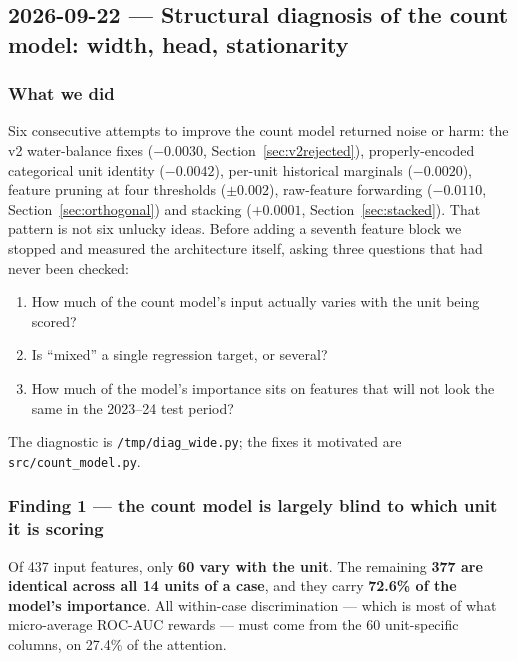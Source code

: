 \subsection{2026-09-22 --- Structural diagnosis of the count model: width, head, stationarity}
\label{sec:diagnosis}

\subsubsection*{What we did}

Six consecutive attempts to improve the count model returned noise or harm: the v2 water-balance
fixes ($-0.0030$, Section~\ref{sec:v2rejected}), properly-encoded categorical unit identity
($-0.0042$), per-unit historical marginals ($-0.0020$), feature pruning at four thresholds
($\pm 0.002$), raw-feature forwarding ($-0.0110$, Section~\ref{sec:orthogonal}) and stacking
($+0.0001$, Section~\ref{sec:stacked}). That pattern is not six unlucky ideas. Before adding a
seventh feature block we stopped and measured the architecture itself, asking three questions
that had never been checked:

\begin{enumerate}
  \item How much of the count model's input actually varies with the unit being scored?
  \item Is ``mixed'' a single regression target, or several?
  \item How much of the model's importance sits on features that will not look the same in the
        2023--24 test period?
\end{enumerate}

The diagnostic is \texttt{/tmp/diag\_wide.py}; the fixes it motivated are
\texttt{src/count\_model.py}.

\subsubsection*{Finding 1 --- the count model is largely blind to which unit it is scoring}

\begin{finding}
Of 437 input features, only \textbf{60 vary with the unit}. The remaining \textbf{377 are
identical across all 14 units of a case}, and they carry \textbf{72.6\% of the model's
importance}. All within-case discrimination --- which is most of what micro-average ROC-AUC
rewards --- must come from the 60 unit-specific columns, on 27.4\% of the attention.
\end{finding}

